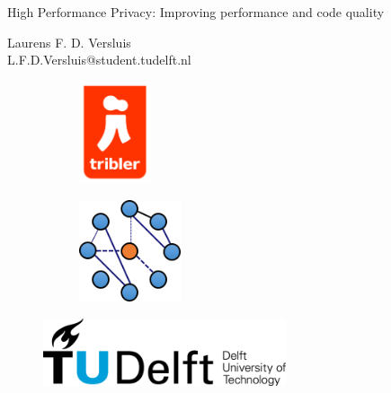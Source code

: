 \begin{titlepage}

\null\vfill

\begin{center}
\LARGE{High Performance Privacy: Improving performance and code quality}
\end{center}

\vspace{1.5cm}

\begin{center}
Laurens F. D. Versluis\\
L.F.D.Versluis@student.tudelft.nl
\end{center}

\vfill

\centering
\begin{figure}[!b]
\captionsetup[subfigure]{labelformat=empty}
\begin{subfigure}{0.4\textwidth}
\centering
\includegraphics[height=3cm]{pics/triblerlogo}
\caption{}
\end{subfigure}%
\begin{subfigure}{0.6\textwidth}
\centering
\includegraphics[height=3cm]{pics/dslogo}
\caption{}
\end{subfigure}%
\end{figure}

\begin{figure}[!b]
\centering
\includegraphics[height=2cm]{pics/TUDLogo}
\end{figure}


\vspace{2.0cm}

\end{titlepage}
